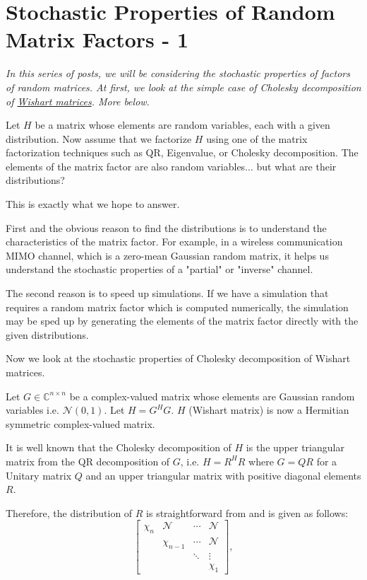 \section{Stochastic Properties of Random Matrix Factors - 1}

\emph{In this series of posts, we will be considering the stochastic properties of factors of random matrices. At first, we look at the simple case of Cholesky decomposition of \href{https://en.wikipedia.org/wiki/Wishart_distribution}{Wishart matrices}. More below.}

Let $H$ be a matrix whose elements are random variables, each with a given distribution. Now assume that we factorize $H$ using one of the matrix factorization techniques such as QR, Eigenvalue, or Cholesky decomposition. The elements of the matrix factor are also random variables... but what are their distributions?

This is exactly what we hope to answer.

First and the obvious reason to find the distributions is to understand the characteristics of the matrix factor. For example, in a wireless communication MIMO channel, which is a zero-mean Gaussian random matrix, it helps us understand the stochastic properties of a "partial" or "inverse" channel.

The second reason is to speed up simulations. If we have a simulation that requires a random matrix factor which is computed numerically, the simulation may be sped up by generating the elements of the matrix factor directly with the given distributions.

Now we look at the stochastic properties of Cholesky decomposition of Wishart matrices.

Let $G \in \mathbb{C}^{n \times n}$ be a complex-valued matrix whose elements are Gaussian random variables i.e. $\mathcal{N}(0,1)$. Let $H = G^H G$. $H$ (Wishart matrix) is now a Hermitian symmetric complex-valued matrix.

It is well known that the Cholesky decomposition of $H$ is the upper triangular matrix from the QR decomposition of $G$, i.e. $H = R^H R$ where $G = QR$ for a Unitary matrix $Q$ and an upper triangular matrix with positive diagonal elements $R$.

Therefore, the distribution of $R$ is straightforward from \cite{Edelman2005} and is given as follows:
$$
\begin{bmatrix}
	\chi_n & \mathcal{N} & \cdots & \mathcal{N} \\
	& \chi_{n-1} & \cdots & \mathcal{N} \\
	&                   & \ddots & \vdots \\
	&                   &            & \chi_1
\end{bmatrix},
$$

